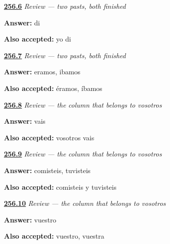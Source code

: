 \noindent\begin{minipage}[t]{\linewidth}
\raggedright
\hyperlink{review-ES-C65-repaso-dos-pasados-di}{\textbf{256.6}} \emph{Review — two pasts, both finished}\par
\small \textbf{Answer:} di\par
\footnotesize \textbf{Also accepted:} yo di
\end{minipage}\par\medskip

\noindent\begin{minipage}[t]{\linewidth}
\raggedright
\hyperlink{review-ES-C65-repaso-dos-pasados-irregulares}{\textbf{256.7}} \emph{Review — two pasts, both finished}\par
\small \textbf{Answer:} eramos, ibamos\par
\footnotesize \textbf{Also accepted:} éramos, íbamos
\end{minipage}\par\medskip

\noindent\begin{minipage}[t]{\linewidth}
\raggedright
\hyperlink{review-ES-C65-repaso-columna-vosotros-presente}{\textbf{256.8}} \emph{Review — the column that belongs to \emph{vosotros}}\par
\small \textbf{Answer:} vais\par
\footnotesize \textbf{Also accepted:} vosotros vais
\end{minipage}\par\medskip

\noindent\begin{minipage}[t]{\linewidth}
\raggedright
\hyperlink{review-ES-C65-repaso-columna-vosotros-preterito}{\textbf{256.9}} \emph{Review — the column that belongs to \emph{vosotros}}\par
\small \textbf{Answer:} comisteis, tuvisteis\par
\footnotesize \textbf{Also accepted:} comisteis y tuvisteis
\end{minipage}\par\medskip

\noindent\begin{minipage}[t]{\linewidth}
\raggedright
\hyperlink{review-ES-C65-repaso-columna-vosotros-posesivo}{\textbf{256.10}} \emph{Review — the column that belongs to \emph{vosotros}}\par
\small \textbf{Answer:} vuestro\par
\footnotesize \textbf{Also accepted:} vuestro, vuestra
\end{minipage}\par\medskip


